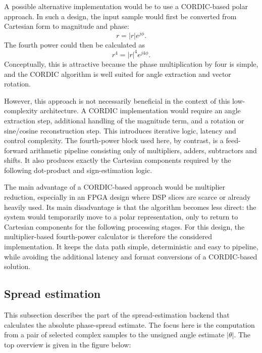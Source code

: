 A possible alternative implementation would be to use a CORDIC-based polar approach. In such 
a design, the input sample would first be converted from Cartesian form to magnitude and 
phase:
\begin{equation}
    r = |r|e^{j\phi}.
\end{equation}
The fourth power could then be calculated as
\begin{equation}
    r^4 = |r|^4 e^{j4\phi}.
\end{equation}
Conceptually, this is attractive because the phase multiplication by four is simple, and the 
CORDIC algorithm is well suited for angle extraction and vector rotation.

However, this approach is not necessarily beneficial in the context of this low-complexity 
architecture. A CORDIC implementation would require an angle extraction step, additional 
handling of the magnitude term, and a rotation or sine/cosine reconstruction step. This 
introduces iterative logic, latency and control complexity. The fourth-power block used here, 
by contrast, is a feed-forward arithmetic pipeline consisting only of multipliers, adders, 
subtractors and shifts. It also produces exactly the Cartesian components required by the 
following dot-product and sign-estimation logic.

The main advantage of a CORDIC-based approach would be multiplier reduction, especially in 
an FPGA design where DSP slices are scarce or already heavily used. Its main disadvantage is 
that the algorithm becomes less direct: the system would temporarily move to a polar 
representation, only to return to Cartesian components for the following processing stages. 
For this design, the multiplier-based fourth-power calculator is therefore the considered implementation. It 
keeps the data path simple, deterministic and easy to pipeline, while avoiding the additional 
latency and format conversions of a CORDIC-based solution.

\subsection{Spread estimation}
\label{subsec:spread-estimation}

This subsection describes the part of the spread-estimation backend that calculates the absolute 
phase-spread estimate. The focus here is the computation from a pair of selected complex samples to the unsigned angle estimate \( |\theta| \).
The top overview is given in the figure below:

